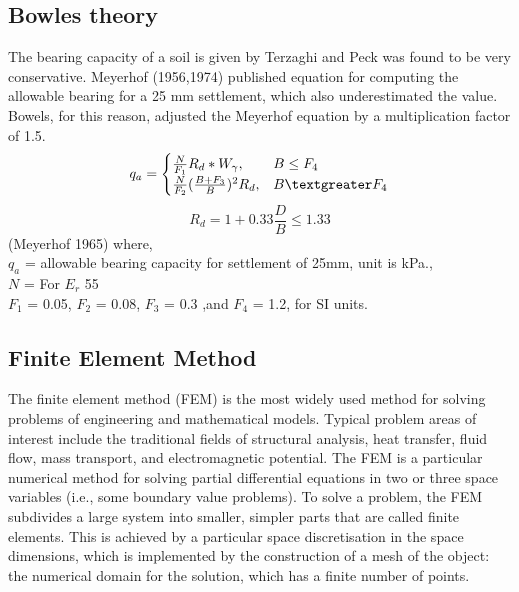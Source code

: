 \subsection{Bowles theory}
The bearing capacity of a soil is given by Terzaghi and Peck was found to be very conservative. Meyerhof (1956,1974) published equation for computing the allowable bearing for a 25 mm settlement, which also underestimated the value. Bowels, for this reason, adjusted the Meyerhof equation by a multiplication factor of 1.5.
\begin{equation}
q_a = \begin{cases}
			\frac{N}{F_1} R_d * W_\gamma, & B \le F_4 \\
			\frac{N}{F_2}(\frac{B+F_3}{B})^2 R_d, & B \textgreater F_4
		\end{cases}
\end{equation}
\begin{equation}
R_d = 1 + 0.33 \frac{D}{B} \le 1.33 
\end{equation} (Meyerhof 1965)
where,\\
$q_a$  = allowable bearing capacity for settlement of 25mm, unit is kPa.,\\
$N$ = For $E_r$ 55\\
$F_1$ = 0.05, $F_2$ = 0.08, $F_3$ = 0.3 ,and $F_4$ = 1.2, for SI units.

\subsection{Finite Element Method}
The finite element method (FEM) is the most widely used method for solving problems of engineering and mathematical models. Typical problem areas of interest include the traditional fields of structural analysis, heat transfer, fluid flow, mass transport, and electromagnetic potential. The FEM is a particular numerical method for solving partial differential equations in two or three space variables (i.e., some boundary value problems). To solve a problem, the FEM subdivides a large system into smaller, simpler parts that are called finite elements. This is achieved by a particular space discretisation in the space dimensions, which is implemented by the construction of a mesh of the object: the numerical domain for the solution, which has a finite number of points. 
